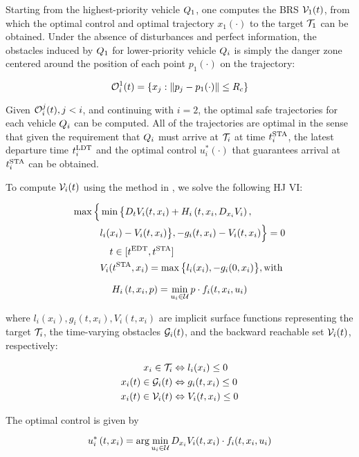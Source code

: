 Starting from the highest-priority vehicle $Q_1$, one computes the BRS $\mathcal{V}_1(t)$, from which the optimal control and optimal trajectory $x_1(\cdot)$ to the target $\mathcal{T}_1$ can be obtained. Under the absence of disturbances and perfect information, the obstacles induced by $Q_1$ for lower-priority vehicle $Q_i$ is simply the danger zone centered around the position of each point $p_1(\cdot)$ on the trajectory:

\begin{equation}
\mathcal{O}_i^1(t) = \{x_j: \|p_j - p_1(\cdot)\|\le R_c\}
\end{equation}

Given $\mathcal{O}_i^j(t), j<i$, and continuing with $i = 2$, the optimal safe trajectories for each vehicle $Q_i$ can be computed. All of the trajectories are optimal in the sense that given the requirement that $Q_i$ must arrive at $\mathcal{T}_i$ at time $t^\text{STA}_i$, the latest departure time $t^\text{LDT}_i$ and the optimal control $u^*_i(\cdot)$ that guarantees arrival at $t^\text{STA}_i$ can be obtained.

To compute $\mathcal{V}_i(t)$ using the method in \cite{Fisac15}, we solve the following HJ VI:

\begin{equation}
\label{eq:HJIVI}
\begin{aligned}
\max\Big\{&\min\big\{D_t V_i(t, x_i) + H_i\left(t, x_i, D_{x_i} V_i\right), \\
&l_i(x_i) - V_i(t, x_i)\big\}, -g_i(t, x_i) - V_i(t, x_i)\Big\} = 0 \\
&\quad t\in[t^\text{EDT},t^\text{STA}]\\
&V_i(t^\text{STA}, x_i) = \max\big\{l_i(x_i), -g_i(0, x_i)\big\}, \text{with}\\ 
\end{aligned}
\end{equation}

\begin{equation}
H_i\left(t, x_i, p\right) = \min_{u_i \in \mathcal{U}} p \cdot f_i(t, x_i, u_i)
\end{equation}

\noindent where $l_i(x_i), g_i(t,x_i),V_i(t,x_i)$ are implicit surface functions representing the target $\mathcal{T}_i$, the time-varying obstacles $\mathcal{G}_i(t)$, and the backward reachable set $\mathcal{V}_i(t)$, respectively: 

\begin{equation}
\label{eq:impl_surf}
\begin{aligned}
x_i \in \mathcal{T}_i &\Leftrightarrow l_i(x_i) \le 0 \\
x_i(t) \in \mathcal{G}_i(t) &\Leftrightarrow g_i(t,x_i) \le 0 \\
x_i(t) \in \mathcal{V}_i(t) &\Leftrightarrow V_i(t, x_i) \le 0
\end{aligned}
\end{equation}

The optimal control is given by

\begin{equation}
\label{eq:optCtrl}
u^*_i\left(t, x_i\right) = \arg \min_{u_i \in \mathcal{U}} D_{x_i} V_i(t,x_i) \cdot f_i(t, x_i, u_i)
\end{equation}